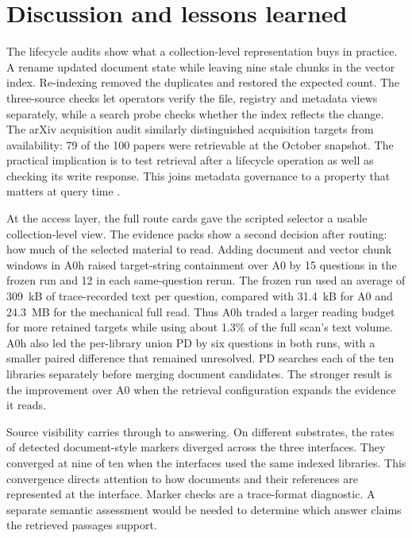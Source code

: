 \section{Discussion and lessons learned}
\label{sec:discussion}

The lifecycle audits show what a collection-level representation buys in
practice. A rename updated document state while leaving nine stale chunks
in the vector index. Re-indexing removed the duplicates and restored the
expected count. The three-source checks let operators verify the file,
registry and metadata views separately, while a search probe checks whether
the index reflects the change. The arXiv acquisition audit similarly
distinguished acquisition targets from availability: 79 of the 100 papers
were retrievable at the October snapshot. The practical implication is to
test retrieval after a lifecycle operation as well as checking its write
response. This joins metadata governance to a property that matters at
query time \citep{park-metadata-quality-2009,paivarinta-ecm-2005}.

At the access layer, the full route cards gave the scripted selector a
usable collection-level view. The evidence packs show a second decision
after routing: how much of the selected material to read. Adding document
and vector chunk windows in A0h raised target-string containment over A0 by
15 questions in the frozen run and 12 in each same-question rerun. The
frozen run used an average of 309~kB of trace-recorded text per question,
compared with 31.4~kB for A0 and 24.3~MB for the mechanical full read. Thus
A0h traded a larger reading budget for more retained targets while using
about 1.3\% of the full scan's text volume. A0h also led the per-library
union PD by six questions in both runs, with a smaller paired difference
that remained unresolved. PD searches each of the ten libraries separately
before merging document candidates. The stronger result is the improvement over A0
when the retrieval configuration expands the evidence it reads.

Source visibility carries through to answering. On different substrates,
the rates of detected document-style markers diverged across the three
interfaces. They converged at nine of ten when the interfaces used the same
indexed libraries. This convergence directs attention to how documents and
their references are represented at the interface. Marker checks are a
trace-format diagnostic. A separate semantic assessment would be needed to
determine which answer claims the retrieved passages support.


